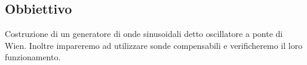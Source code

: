\subsection{Obbiettivo}

Costruzione di un generatore di onde sinusoidali detto oscillatore a ponte di Wien.
Inoltre impareremo ad utilizzare sonde compensabili e verificheremo il loro funzionamento. 
